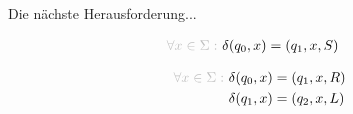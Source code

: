 \documentclass[aspectratio=169,usepdftitle=true,11pt,ngerman,t]{beamer}
\begin{document}
\begin{frame}{Die nächste Herausforderung...}
    \begin{minipage}[t]{0.45\linewidth}%
        \vspace{0em}%
        \begin{tcolorbox}[boxrule=0.1pt]
        \vspace*{-\baselineskip}\begin{alignat*}{2}
            \textcolor{lightgray}{\forall x\in\Sigma:~} &\delta(q_0,x)=(q_1,x,S)
        \end{alignat*}
    \end{tcolorbox}\end{minipage}\hfill%
    \begin{minipage}[t]{0.45\linewidth}%
        \vspace{0em}%
        \begin{tcolorbox}[boxrule=0.1pt]
        \vspace*{-\baselineskip}\begin{alignat*}{2}
            \textcolor{lightgray}{\forall x\in\Sigma:~} &\delta(q_0,x)=(q_1,x,R)\\
            &\delta(q_1,x)=(q_2,x,L)
        \end{alignat*}
    \end{tcolorbox}\end{minipage}
\end{frame}
\end{document}
